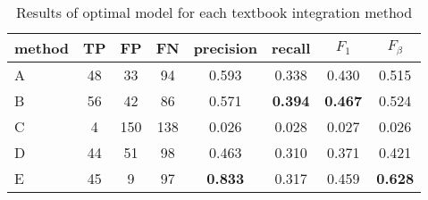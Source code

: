 \begin{table*}
\centering
\caption{Results of optimal model for each textbook integration method}
\label{table:phase1-results}
\begin{tabular}{lccccccc}
\toprule
method & TP & FP & FN & precision & recall & $F_1$ & $F_\beta$ \\
\midrule
A & 48 & 33 & 94 & 0.593 & 0.338 & 0.430 & 0.515 \\
B & 56 & 42 & 86 & 0.571 & \textbf{0.394} & \textbf{0.467} & 0.524 \\
C & 4 & 150 & 138 & 0.026 & 0.028 & 0.027 & 0.026 \\
D & 44 & 51 & 98 & 0.463 & 0.310 & 0.371 & 0.421 \\
E & 45 & 9 & 97 & \textbf{0.833} & 0.317 & 0.459 & \textbf{0.628} \\
\bottomrule
\end{tabular}
\end{table*}

